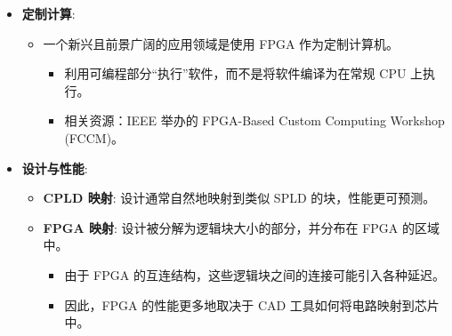 \documentclass[
  ignorenonframetext,
  chinese,
]{beamer}
\providecommand{\tightlist}{%
  \setlength{\itemsep}{0pt}\setlength{\parskip}{0pt}}
\begin{document}
\begin{frame}
\begin{itemize}
\tightlist
\item
  \textbf{定制计算}:

  \begin{itemize}
  \tightlist
  \item
    一个新兴且前景广阔的应用领域是使用 FPGA 作为定制计算机。

    \begin{itemize}
    \tightlist
    \item
      利用可编程部分``执行''软件，而不是将软件编译为在常规 CPU 上执行。
    \item
      相关资源：IEEE 举办的 FPGA-Based Custom Computing Workshop
      (FCCM)。
    \end{itemize}
  \end{itemize}
\item
  \textbf{设计与性能}:

  \begin{itemize}
  \tightlist
  \item
    \textbf{CPLD 映射}: 设计通常自然地映射到类似 SPLD
    的块，性能更可预测。
  \item
    \textbf{FPGA 映射}: 设计被分解为逻辑块大小的部分，并分布在 FPGA
    的区域中。

    \begin{itemize}
    \tightlist
    \item
      由于 FPGA 的互连结构，这些逻辑块之间的连接可能引入各种延迟。
    \item
      因此，FPGA 的性能更多地取决于 CAD 工具如何将电路映射到芯片中。
    \end{itemize}
  \end{itemize}
\end{itemize}
\end{frame}
\end{document}
